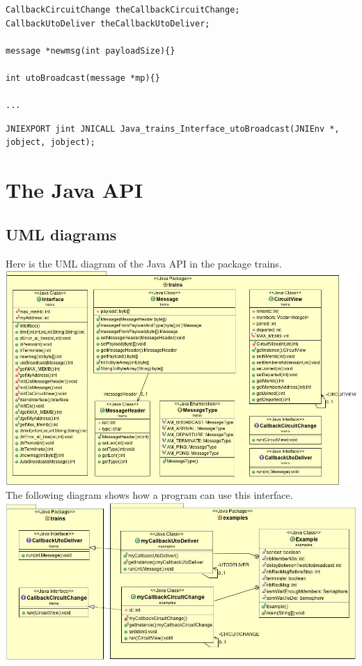 \documentclass[a4paper,10pt]{report}
\begin{document}
\begin{itemize}
\begin{lstlisting}
CallbackCircuitChange theCallbackCircuitChange;
CallbackUtoDeliver theCallbackUtoDeliver;

message *newmsg(int payloadSize){}

int utoBroadcast(message *mp){}

...

\end{lstlisting}

\lstset{language=C}
\lstset{commentstyle=\textit} 
\begin{lstlisting}
JNIEXPORT jint JNICALL Java_trains_Interface_utoBroadcast(JNIEnv *, jobject, jobject);
\end{lstlisting}
\end{itemize}

\section{The Java API}

\subsection{UML diagrams}

Here is the UML diagram of the Java API in the package trains.\\

\includegraphics[scale=0.55]{img/trainsInterface.jpg}\\

The following diagram shows how a program can use this interface.\\

\includegraphics[scale=0.55]{img/example.jpg}\\
\end{document}

